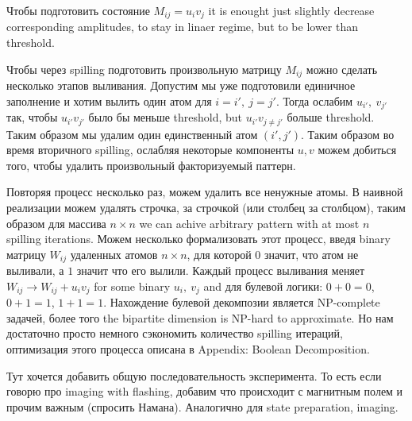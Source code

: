 Чтобы подготовить состояние $M_{ij} = u_i v_j$ it is enought just slightly decrease corresponding amplitudes, to stay in linaer regime, but to be lower than threshold.



Чтобы через spilling подготовить произвольную матрицу $M_{ij}$ можно сделать несколько этапов выливания. Допустим мы уже подготовили единичное заполнение и хотим вылить один атом для $i=i',\ j=j'$. Тогда ослабим $u_{i'},\ v_{j'}$ так, чтобы $u_{i'} v_{j'}$ было бы меньше threshold, but $u_{i'} v_{j \neq j'}$ больше threshold. Таким образом мы удалим один единственный атом $(i', j')$. Таким образом во время вторичного spilling, ослабляя некоторые компоненты $u,v$ можем добиться того, чтобы удалить произвольный факторизуемый паттерн. 

Повторяя процесс несколько раз, можем удалить все ненужные атомы. В наивной реализации можем удалять строчка, за строчкой (или столбец за столбцом), таким образом для массива $n \times n$ we can achive arbitrary pattern with at most $n$ spilling iterations. Можем несколько формализовать этот процесс, введя binary матрицу $W_{ij}$ удаленных атомов $n \times n$, для которой $0$ значит, что атом не выливали, а $1$ значит что его вылили. Каждый процесс выливания меняет $W_{ij} \to W_{ij} + u_i v_j$ for some binary $u_i, \ v_j$ and для булевой логики: $0+0=0$, $0+1=1$, $1+1=1$. Нахождение булевой декомпозии является NP-complete задачей, более того  the bipartite dimension is NP-hard to approximate. Но нам достаточно просто немного сэкономить количество spilling итераций, оптимизация этого процесса описана в Appendix: Boolean Decomposition. 


Тут хочется добавить общую последовательность эксперимента. То есть если говорю про imaging with flashing, добавим что происходит с магнитным полем и прочим важным (спросить Намана). Аналогично для state preparation, imaging.


